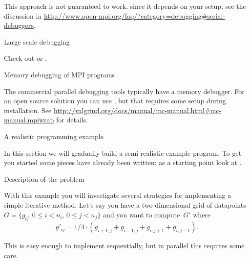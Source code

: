 This approach is not guaranteed to work, since it depends on
your  setup; see the discussion
in \url{http://www.open-mpi.org/faq/?category=debugging#serial-debuggers}.

 {Large scale debugging}

Check out  or .

 {Memory debugging of MPI programs}

The commercial parallel debugging tools typically have a memory
debugger. For an open source solution you can
use , but that requires some setup during
installation. See \url{http://valgrind.org/docs/manual/mc-manual.html#mc-manual.mpiwrap}
for details.

 {A realistic programming example}

In this section we will gradually build a semi-realistic example
program. To get you started some pieces have already been written:
as a starting point look at .

 {Description of the problem}

With this example you will investigate several strategies for
implementing a simple iterative method. Let's say you have a
two-dimensional grid of datapoints $G=\{g_{ij}\colon 0\leq
i<n_i,\,0\leq j<n_j\}$ and you want to compute~$G'$ where
\begin{equation}
g'_{ij} = 1/4 \cdot (g_{i+1,j}+g_{i-1,j}+g_{i,j+1}+g_{i,j-1}).
\label{eq:grid-update}
\end{equation}

This is easy enough to implement sequentially, but in parallel this
requires some care.

